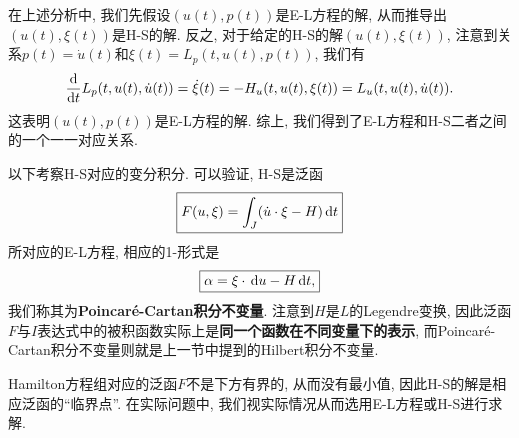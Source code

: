\begin{remark}
    在上述分析中, 我们先假设$(u(t), p(t))$是E-L方程的解, 从而推导出$(u(t), \xi(t))$是H-S的解.
    反之, 对于给定的H-S的解$(u(t), \xi(t))$, 注意到关系$p(t) = \dot u(t)$和$\xi(t) = L_p(t, u(t), p(t))$, 我们有 
    \begin{equation*}
        \frac{{\rm d}}{{\rm d}t}L_p(t, u(t), \dot u(t)) = \dot\xi(t) = -H_u(t, u(t), \xi(t)) = L_u(t, u(t), \dot u(t)). 
    \end{equation*}
    这表明$(u(t), p(t))$是E-L方程的解. 综上, 我们得到了E-L方程和H-S二者之间的一个一一对应关系.
\end{remark}

以下考察H-S对应的变分积分. 可以验证, H-S是泛函 
\begin{equation*}
    \boxed{F(u, \xi) = \int_J(\dot u \cdot \xi - H) \,{\rm d}t}
\end{equation*}
所对应的E-L方程, 相应的1-形式是 
\begin{equation*}
    \boxed{\alpha = \xi \cdot \,{\rm d}u - H \,{\rm d}t,}
\end{equation*}
我们称其为\textbf{Poincaré-Cartan积分不变量}. 注意到$H$是$L$的Legendre变换, 因此泛函$F$与$I$表达式中的被积函数实际上是\textbf{同一个函数在不同变量下的表示}, 而Poincaré-Cartan积分不变量则就是上一节中提到的Hilbert积分不变量.

\begin{remark}
    Hamilton方程组对应的泛函$F$不是下方有界的, 从而没有最小值, 因此H-S的解是相应泛函的``临界点''.
    在实际问题中, 我们视实际情况从而选用E-L方程或H-S进行求解.
\end{remark}


